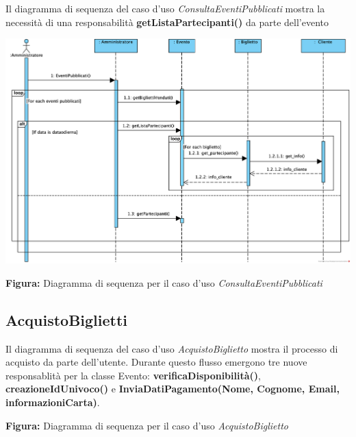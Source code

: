 \begin{center}
    Il diagramma di sequenza del caso d'uso \textit{ConsultaEventiPubblicati} mostra la necessità di una responsabilità \textbf{getListaPartecipanti()} da parte dell'evento

    \vspace{2ex}
    \includegraphics[width=0.8\linewidth]{assets/casid'uso/ConsultaEventiPubblicati.png}

    \vspace{1ex}
    \textbf{Figura:} Diagramma di sequenza per il caso d’uso \textit{ConsultaEventiPubblicati}
\end{center}


\newpage
{
\subsection{AcquistoBiglietti}

\begin{center}
Il diagramma di sequenza del caso d’uso \textit{AcquistoBiglietto} mostra il processo di acquisto da parte dell’utente. Durante questo flusso emergono tre nuove responsablità per la classe Evento: \textbf{verificaDisponibilità()}, \textbf{creazioneIdUnivoco()} e \textbf{InviaDatiPagamento(Nome, Cognome, Email, informazioniCarta)}. 
\vspace*{2mm}

\vspace{1ex}
\textbf{Figura:} Diagramma di sequenza per il caso d’uso \textit{AcquistoBiglietto}
\end{center}
}

